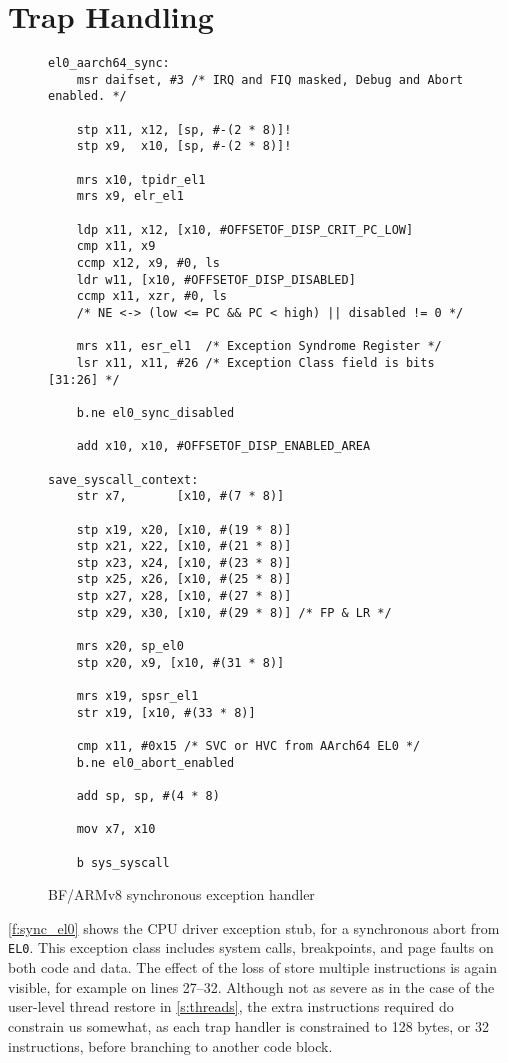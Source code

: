 \documentclass[a4paper,twoside]{report}
\begin{document}
\section{Trap Handling}\label{s:traps}

\begin{figure}
\begin{lstlisting}
el0_aarch64_sync:
    msr daifset, #3 /* IRQ and FIQ masked, Debug and Abort enabled. */

    stp x11, x12, [sp, #-(2 * 8)]!
    stp x9,  x10, [sp, #-(2 * 8)]!

    mrs x10, tpidr_el1
    mrs x9, elr_el1

    ldp x11, x12, [x10, #OFFSETOF_DISP_CRIT_PC_LOW]
    cmp x11, x9
    ccmp x12, x9, #0, ls
    ldr w11, [x10, #OFFSETOF_DISP_DISABLED]
    ccmp x11, xzr, #0, ls
    /* NE <-> (low <= PC && PC < high) || disabled != 0 */

    mrs x11, esr_el1  /* Exception Syndrome Register */
    lsr x11, x11, #26 /* Exception Class field is bits [31:26] */

    b.ne el0_sync_disabled

    add x10, x10, #OFFSETOF_DISP_ENABLED_AREA

save_syscall_context:
    str x7,       [x10, #(7 * 8)]

    stp x19, x20, [x10, #(19 * 8)]
    stp x21, x22, [x10, #(21 * 8)]
    stp x23, x24, [x10, #(23 * 8)]
    stp x25, x26, [x10, #(25 * 8)]
    stp x27, x28, [x10, #(27 * 8)]
    stp x29, x30, [x10, #(29 * 8)] /* FP & LR */

    mrs x20, sp_el0
    stp x20, x9, [x10, #(31 * 8)]

    mrs x19, spsr_el1
    str x19, [x10, #(33 * 8)]

    cmp x11, #0x15 /* SVC or HVC from AArch64 EL0 */
    b.ne el0_abort_enabled

    add sp, sp, #(4 * 8)

    mov x7, x10

    b sys_syscall
\end{lstlisting}
\caption{BF/ARMv8 synchronous exception handler}
\label{f:sync_el0}
\end{figure}

\autoref{f:sync_el0} shows the CPU driver exception stub, for a synchronous
abort from \texttt{EL0}. This exception class includes system calls,
breakpoints, and page faults on both code and data. The effect of the loss of
store multiple instructions is again visible, for example on lines 27--32.
Although not as severe as in the case of the user-level thread restore in
\autoref{s:threads}, the extra instructions required do constrain us somewhat,
as each trap handler is constrained to 128 bytes, or 32 instructions, before
branching to another code block.
\end{document}
